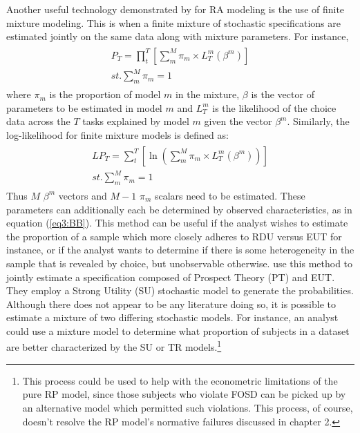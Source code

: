 \documentclass[../main.tex]{subfiles}
\begin{document}
Another useful technology demonstrated by \textcite{Harrison2009} for RA modeling is the use of finite mixture modeling.
This is when a finite mixture of stochastic specifications are estimated jointly on the same data along with mixture parameters.
For instance,
\begin{align}
	\label{eq3:PT_Mix}
	\begin{split}
		\bm{\mathit{P_T}} = \prod_t^T \left[ \sum_m^M \pi_m \times L_T^m(\beta^m) \right]\\
		\mathit{st.} \sum_m^M \pi_m = 1
	\end{split}
\end{align}
\noindent where $\pi_m$ is the proportion of model $m$ in the mixture, $\beta$ is the vector of parameters to be estimated in model $m$ and $L_T^m$ is the likelihood of the choice data across the $T$ tasks explained by model $m$ given the vector $\beta^m$.
Similarly, the log-likelihood for finite mixture models is defined as:
\begin{align}
	\label{eq3:LPT_Mix}
	\begin{split}
		\bm{\mathit{LP_T}} = \sum_t^T \left[ \ln \left( \sum_m^M \pi_m \times L_T^m(\beta^m) \right) \right]\\
		\mathit{st.} \sum_m^M \pi_m = 1
	\end{split}
\end{align}
\noindent Thus $M$ $\beta^m$ vectors and $M-1$ $\pi_m$ scalars need to be estimated.
These parameters can additionally each be determined by observed characteristics, as in equation (\ref{eq3:BB}).
This method can be useful if the analyst wishes to estimate the proportion of a sample which more closely adheres to RDU versus EUT for instance, or if the analyst wants to determine if there is some heterogeneity in the sample that is revealed by choice, but unobservable otherwise.
\textcite[141]{Harrison2009} use this method to jointly estimate a specification composed of Prospect Theory (PT) and EUT.
They employ a Strong Utility (SU) stochastic model to generate the probabilities.
Although there does not appear to be any literature doing so, it is possible to estimate a mixture of two differing stochastic models.
For instance, an analyst could use a mixture model to determine what proportion of subjects in a dataset are better characterized by the SU or TR models.\footnote{
	This process could be used to help with the econometric limitations of the pure RP model, since those subjects who violate FOSD can be picked up by an alternative model which permitted such violations.
	This process, of course, doesn't resolve the RP model's normative failures discussed in chapter 2.
}
\end{document}

